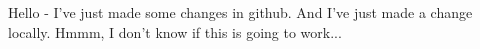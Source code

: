 \documentclass{article}
\begin{document}
Hello - I've just made some changes in github. And I've just made a change locally.
Hmmm, I don't know if this is going to work...
\end{document}
